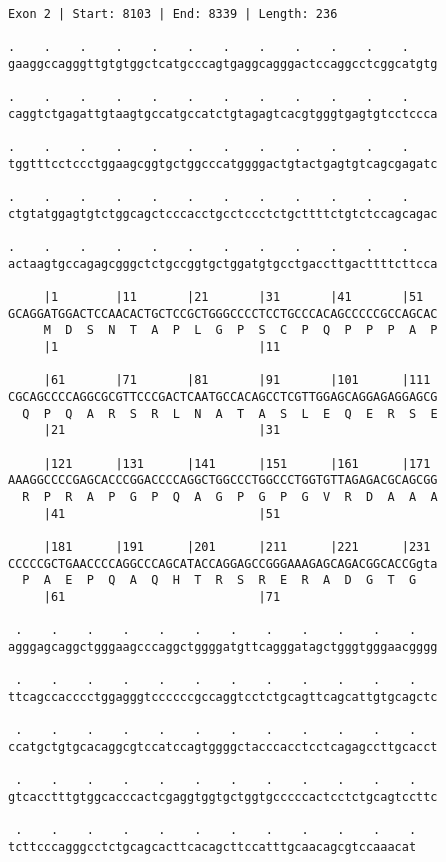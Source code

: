 \documentclass{article}
\begin{document}
\newpage
\begin{Verbatim}
Exon 2 | Start: 8103 | End: 8339 | Length: 236
 
.    .    .    .    .    .    .    .    .    .    .    .    
gaaggccagggttgtgtggctcatgcccagtgaggcagggactccaggcctcggcatgtg
  
.    .    .    .    .    .    .    .    .    .    .    .    
caggtctgagattgtaagtgccatgccatctgtagagtcacgtgggtgagtgtcctccca
  
.    .    .    .    .    .    .    .    .    .    .    .    
tggtttcctccctggaagcggtgctggcccatggggactgtactgagtgtcagcgagatc
  
.    .    .    .    .    .    .    .    .    .    .    .    
ctgtatggagtgtctggcagctcccacctgcctccctctgcttttctgtctccagcagac
  
.    .    .    .    .    .    .    .    .    .    .    .    
actaagtgccagagcgggctctgccggtgctggatgtgcctgaccttgacttttcttcca
  
     |1        |11       |21       |31       |41       |51  
GCAGGATGGACTCCAACACTGCTCCGCTGGGCCCCTCCTGCCCACAGCCCCCGCCAGCAC
     M  D  S  N  T  A  P  L  G  P  S  C  P  Q  P  P  P  A  P
     |1                            |11                      
  
     |61       |71       |81       |91       |101      |111 
CGCAGCCCCAGGCGCGTTCCCGACTCAATGCCACAGCCTCGTTGGAGCAGGAGAGGAGCG
  Q  P  Q  A  R  S  R  L  N  A  T  A  S  L  E  Q  E  R  S  E
     |21                           |31                      
  
     |121      |131      |141      |151      |161      |171 
AAAGGCCCCGAGCACCCGGACCCCAGGCTGGCCCTGGCCCTGGTGTTAGAGACGCAGCGG
  R  P  R  A  P  G  P  Q  A  G  P  G  P  G  V  R  D  A  A  A
     |41                           |51                      
  
     |181      |191      |201      |211      |221      |231 
CCCCCGCTGAACCCCAGGCCCAGCATACCAGGAGCCGGGAAAGAGCAGACGGCACCGgta
  P  A  E  P  Q  A  Q  H  T  R  S  R  E  R  A  D  G  T  G   
     |61                           |71                      
  
 .    .    .    .    .    .    .    .    .    .    .    .   
agggagcaggctgggaagcccaggctggggatgttcagggatagctgggtgggaacgggg
  
 .    .    .    .    .    .    .    .    .    .    .    .   
ttcagccacccctggagggtccccccgccaggtcctctgcagttcagcattgtgcagctc
  
 .    .    .    .    .    .    .    .    .    .    .    .   
ccatgctgtgcacaggcgtccatccagtggggctacccacctcctcagagccttgcacct
  
 .    .    .    .    .    .    .    .    .    .    .    .   
gtcacctttgtggcacccactcgaggtggtgctggtgcccccactcctctgcagtccttc
  
 .    .    .    .    .    .    .    .    .    .    .    .
tcttcccagggcctctgcagcacttcacagcttccatttgcaacagcgtccaaacat
\end{Verbatim}
\end{document}
